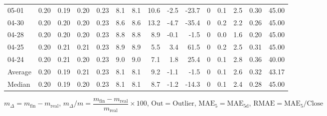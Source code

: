 \begin{threeparttable}
{\begin{tabular}{lrrrrrrrrrrrrrr}
  05-01 &          0.20 &          0.19 &          0.20 &        0.23 &                 8.1 &                8.1 &                10.6 &       -2.5 &        -23.7 &              0 &                 0.1 &              2.5 &            0.30 &                  45.00 \\
  04-30 &          0.20 &          0.20 &          0.20 &        0.23 &                 8.6 &                8.6 &                13.2 &       -4.7 &        -35.4 &              0 &                 0.2 &              2.2 &            0.26 &                  45.00 \\
  04-28 &          0.20 &          0.20 &          0.20 &        0.23 &                 8.8 &                8.8 &                 8.9 &       -0.1 &         -1.5 &              0 &                 0.0 &              1.6 &            0.20 &                  45.00 \\
  04-25 &          0.20 &          0.21 &          0.21 &        0.23 &                 8.9 &                8.9 &                 5.5 &        3.4 &         61.5 &              0 &                 0.2 &              2.5 &            0.31 &                  45.00 \\
  04-24 &          0.20 &          0.21 &          0.20 &        0.23 &                 9.0 &                9.0 &                 7.1 &        1.8 &         25.4 &              0 &                 0.1 &              2.8 &            0.36 &                  40.00 \\
Average &          0.20 &          0.19 &          0.21 &        0.23 &                 8.1 &                8.1 &                 9.2 &       -1.1 &         -1.5 &              0 &                 0.1 &              2.6 &            0.32 &                  43.17 \\
 Median &          0.20 &          0.19 &          0.20 &        0.23 &                 8.1 &                8.1 &                 8.7 &       -1.2 &        -14.3 &              0 &                 0.1 &              2.4 &            0.28 &                  45.00 \\
\bottomrule
\end{tabular}
}
\begin{tablenotes}\footnotesize
\item $m_\Delta=m_{\text{fin}}-m_{\text{real}}$,
$m_\Delta/m=\dfrac{m_{\text{fin}}-m_{\text{real}}}{m_{\text{real}}}\times100$,
$\mathrm{Out}=\text{Outlier}$,
$\mathrm{MAE}_5=\mathrm{MAE}_{5\text{d}}$,
$\mathrm{RMAE}=\mathrm{MAE}_5/\text{Close}$
\end{tablenotes}
\end{threeparttable}
\endgroup

